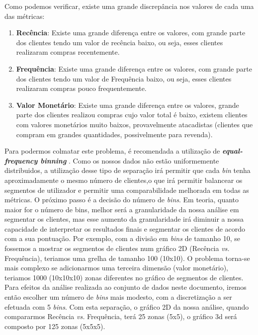 \documentclass{easychair}
\begin{document}
Como podemos verificar, existe uma grande discrepância nos valores de cada uma das métricas:

\begin{enumerate}
    \item \textbf{Recência}: Existe uma grande diferença entre os valores, com grande parte dos clientes tendo um valor de recência baixo, ou seja, esses clientes realizaram compras recentemente.
    \item \textbf{Frequência}: Existe uma grande diferença entre os valores, com grande parte dos clientes tendo um valor de Frequência baixo, ou seja, esses clientes realizaram compras pouco frequentemente.
    \item \textbf{Valor Monetário}: Existe uma grande diferença entre os valores, grande parte dos clientes  realizou compras cujo valor total é baixo, existem clientes com valores monetários muito baixos, provavelmente atacadistas (clientes que compram em grandes quantidades, possivelmente para revenda).
\end{enumerate}

Para podermos colmatar este problema, é recomendada a utilização de \textbf{\textit{equal-frequency binning}} \cite{RFMSDM2004}. Como os nossos dados não estão uniformemente distribuidos, a utilização desse tipo de separação irá permitir que cada \textit{bin} tenha aproximadamente o mesmo número de clientes,o que irá permitir balancear os segmentos de utilizador e permitir uma comparabilidade melhorada em todas as métricas.
O próximo passo é a decisão do número de \textit{bins}. Em teoria, quanto maior for o número de bins, melhor será a granularidade da nossa análise em segmentar os clientes, mas esse aumento da granularidade irá diminuir a nossa capacidade de interpretar os resultados finais e segmentar os clientes de acordo com a sua pontuação. Por exemplo, com a divisão em \textit{bins} de tamanho 10, se fossemos a mostrar os segmentos de clientes num gráfico 2D (Recência \textit{vs.} Frequência), teriamos uma grelha de tamanho 100 (10x10). O problema torna-se mais complexo se adicionarmos uma terceira dimensão (valor monetário), teriamos 1000 (10x10x10) zonas diferentes no gráfico de segmentos de clientes. 
Para efeitos da análise realizada ao conjunto de dados neste documento, iremos então escolher um número de \textit{bins} mais modesto, com a discretização a ser efetuada com 5 \textit{bins}. Com esta separação, o gráfico 2D da nossa análise, quando compararmos Recência \textit{vs.} Frequência, terá 25 zonas (5x5), o gráfico 3d será composto por 125 zonas (5x5x5).
\end{document}
